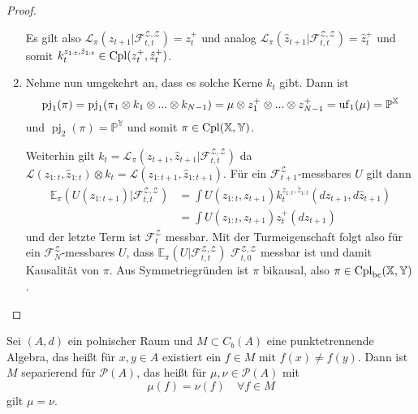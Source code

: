 \begin{proof}
\begin{enumerate}
Es gilt also $\mathcal{L}_\pi(z_{t+1} \vert \mathcal{F}_{t,t}^{\mathcal{Z,Z}}) = z_t^+$ und analog $\mathcal{L}_\pi(\hat{z}_{t+1} \vert \mathcal{F}_{t,t}^{\mathcal{Z,Z}}) = \hat{z}_t^+$ und somit $k_t^{z_{1:t}, \hat{z}_{1:t}} \in \operatorname{Cpl}(z_t^+, \hat{z}_t^+)$.
\item
Nehme nun umgekehrt an, dass es solche Kerne $k_t$ gibt. Dann ist 
$$\operatorname{pj}_1(\pi) = \operatorname{pj}_1(\pi_1 \otimes k_1 \otimes ... \otimes k_{N-1}) = \mu \otimes z_1^+ \otimes ... \otimes z_{N-1}^+ = \operatorname{uf}_1(\mu) = \mathbb{P}^\mathbb{X}$$
und $\operatorname{pj}_2(\pi) = \mathbb{P}^\mathbb{Y}$ und somit $\pi \in \operatorname{Cpl}(\mathbb{X}, \mathbb{Y})$. 

Weiterhin gilt $k_t = \mathcal{L}_\pi(z_{t+1}, \hat{z}_{t+1} \vert \mathcal{F}_{t,t}^{\mathcal{Z,Z}})$ da $\mathcal{L}(z_{1:t}, \hat{z}_{1:t}) \otimes k_t = \mathcal{L}(z_{1:t+1}, \hat{z}_{1:t+1})$. Für ein $\mathcal{F}_{t+1}^\mathcal{Z}$-messbares $U$ gilt dann
\begin{align*}
    \mathbb{E}_\pi(U(z_{1:t+1}) \vert \mathcal{F}_{t,t}^{\mathcal{Z,Z}}) &= \int U(z_{1:t}, z_{t+1}) k_t^{z_{1:t}, \hat{z}_{1:t}}(dz_{t+1}, d\hat{z}_{t+1}) \\
    &= \int U(z_{1:t}, z_{t+1}) z_t^+(dz_{t+1})
\end{align*}
und der letzte Term ist $\mathcal{F}_{t}^{\mathcal{Z}}$ messbar. Mit der Turmeigenschaft folgt also für ein $\mathcal{F}_N^\mathcal{Z}$-messbares $U$, dass $\mathbb{E}_\pi\left(U \vert \mathcal{F}_{t,t}^{\mathcal{Z,Z}}\right)$ $\mathcal{F}_{t,0}^{\mathcal{Z,Z}}$ messbar ist und damit Kausalität von $\pi$. Aus Symmetriegründen ist $\pi$ bikausal, also $\pi \in \operatorname{Cpl}_{\operatorname{bc}}(\mathbb{X}, \mathbb{Y})$.
\end{enumerate}
\end{proof}
\begin{theorem} \label{thm:separating_measures}%
    Sei $(A, d)$ ein polnischer Raum und $M \subset C_b(A)$ eine punktetrennende Algebra, das heißt für $x,y\in A$ existiert ein $f\in M$ mit $f(x)\neq f(y)$. Dann ist $M$ separierend für $\mathcal{P}(A)$, das heißt für $\mu, \nu \in \mathcal{P}(A)$ mit
    \begin{equation}\label{eq:A20}
        \mu(f)=\nu(f) \quad \forall f \in M 
    \end{equation}
    gilt $\mu=\nu$.
\end{theorem}
